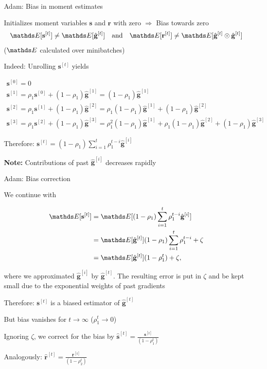 \documentclass[11pt,compress,t,notes=noshow, xcolor=table]{beamer}
\begin{document}
\begin{framei}[fs=small]{Adam: Bias in moment estimates}
\item Initializes moment variables $\mathbf{s}$ and $\mathbf{r}$ with zero $\Rightarrow$ Bias towards zero
$$
\E[\mathbf{s}^{[t]}] \neq \E [\hat{\mathbf{g}}^{[t]}] \quad \text{and} \quad \E[\mathbf{r}^{[t]}] \neq \E [\hat{\mathbf{g}}^{[t]} \odot \hat{\mathbf{g}}^{[t]}]
$$
($\E$ calculated over minibatches)
\item Indeed: Unrolling $\mathbf{s}^{[t]}$ yields
\begin{footnotesize}
\begin{gather*}
\mathbf{s}^{[0]} = 0 \\
\mathbf{s}^{[1]} = \rho_1\mathbf{s}^{[0]} + (1 - \rho_1) \hat{\mathbf{g}}^{[1]} = (1 - \rho_1) \hat{\mathbf{g}}^{[1]} \\
\mathbf{s}^{[2]} = \rho_1\mathbf{s}^{[1]} + (1 - \rho_1) \hat{\mathbf{g}}^{[2]} = \rho_1 (1 - \rho_1) \hat{\mathbf{g}}^{[1]} + (1 - \rho_1) \hat{\mathbf{g}}^{[2]} \\
\mathbf{s}^{[3]} = \rho_1\mathbf{s}^{[2]} + (1 - \rho_1) \hat{\mathbf{g}}^{[3]} = \rho_1^2 (1 - \rho_1) \hat{\mathbf{g}}^{[1]} + \rho_1 (1 - \rho_1) \hat{\mathbf{g}}^{[2]} + (1 - \rho_1) \hat{\mathbf{g}}^{[3]}
\end{gather*}
\end{footnotesize}
\item Therefore: $\mathbf{s}^{[t]}  = (1 - \rho_1) \sum_{i=1}^t \rho_1^{t - i} \hat{\mathbf{g}}^{[i]}$
\item \textbf{Note:} Contributions of past $\hat{\mathbf{g}}^{[i]}$ decreases rapidly
\end{framei}


\begin{framei}[fs=small]{Adam: Bias correction}
\item We continue with
\begin{footnotesize}
\begin{align*}
\E [\mathbf{s}^{[t]}] &= \E [ (1 - \rho_1) \sum_{i=1}^t \rho_1^{t - i} \hat{\mathbf{g}}^{[i]}] \\
&= \E [\hat{\mathbf{g}}^{[t]}] (1 - \rho_1) \sum_{i=1}^t \rho_1^{t - i} + \zeta\\
&= \E [\hat{\mathbf{g}}^{[t]}] (1 - \rho_1^{t}) + \zeta,
\end{align*}
\end{footnotesize}
where we approximated $\hat{\mathbf{g}}^{[i]}$ by $\hat{\mathbf{g}}^{[t]}$.
The resulting error is put in $\zeta$ and be kept small due to the exponential weights of past gradients
\item Therefore: $\mathbf{s}^{[t]}$ is a biased estimator of $\hat{\mathbf{g}}^{[t]}$
\item But bias vanishes for $t \to \infty$ ($\rho_1^t \rightarrow 0$)
\item Ignoring $\zeta$, we correct for the bias by $\hat{\mathbf{s}}^{[t]} = \frac{\mathbf{s}^{[t]}}{(1 - \rho_1^{t})}$
\item Analogously: $\hat{\mathbf{r}}^{[t]} = \frac{\mathbf{r}^{[t]}}{(1 - \rho_2^{t})}$
\end{framei}
\end{document}
